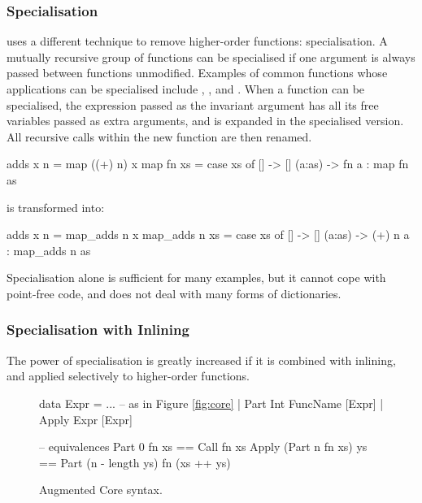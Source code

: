 \subsubsection{Specialisation}

\oldtool{} uses a different technique to remove higher-order functions: specialisation. A mutually recursive group of functions can be specialised if one argument is always passed between functions unmodified. Examples of common functions whose applications can be specialised include , ,  and . When a function can be specialised, the expression passed as the invariant argument has all its free variables passed as extra arguments, and is expanded in the specialised version. All recursive calls within the new function are then renamed.

\begin{example}
\begin{code}
adds x n = map ((+) n) x
map fn xs =  case  xs of
             []      -> []
             (a:as)  -> fn a : map fn as
\end{code}

\noindent is transformed into:

\begin{code}
adds x n = map_adds n x
map_adds n xs =  case  xs of
                 []      -> []
                 (a:as)  -> (+) n a : map_adds n as
\end{code}\codeexample
\end{example}

Specialisation alone is sufficient for many examples, but it cannot cope with point-free code, and does not deal with many forms of dictionaries.

\subsubsection{Specialisation with Inlining}

The power of specialisation is greatly increased if it is combined with inlining, and applied selectively to higher-order functions.

\begin{figure}
\ignore\begin{code}
data Expr  =  ... -- as in Figure {\ref{fig:core}}
           |  Part   Int FuncName [Expr]
           |  Apply  Expr [Expr]

-- equivalences
Part 0 fn xs == Call fn xs
Apply (Part n fn xs) ys == Part (n - length ys) fn (xs ++ ys)
\end{code}
\caption{Augmented Core syntax.}
\label{fig:core_ho}
\figureend
\end{figure}

